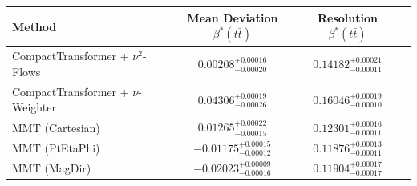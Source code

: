     \begin{tabular}{lccc}
        \toprule
        Method & Mean Deviation $\beta^*(t\bar{t})$ & Resolution $\beta^*(t\bar{t})$ \\
        \midrule
        CompactTransformer + $\nu^2$-Flows & $0.00208^{+0.00016}_{-0.00020}$ & $0.14182^{+0.00021}_{-0.00011}$ \\
        CompactTransformer + $\nu$-Weighter & $0.04306^{+0.00019}_{-0.00026}$ & $0.16046^{+0.00019}_{-0.00010}$ \\
        MMT (Cartesian) & $0.01265^{+0.00022}_{-0.00015}$ & $0.12301^{+0.00016}_{-0.00011}$ \\
        MMT (PtEtaPhi) & $-0.01175^{+0.00015}_{-0.00012}$ & $0.11876^{+0.00013}_{-0.00011}$ \\
        MMT (MagDir) & $-0.02023^{+0.00009}_{-0.00016}$ & $0.11904^{+0.00017}_{-0.00017}$ \\
        \bottomrule
    \end{tabular}